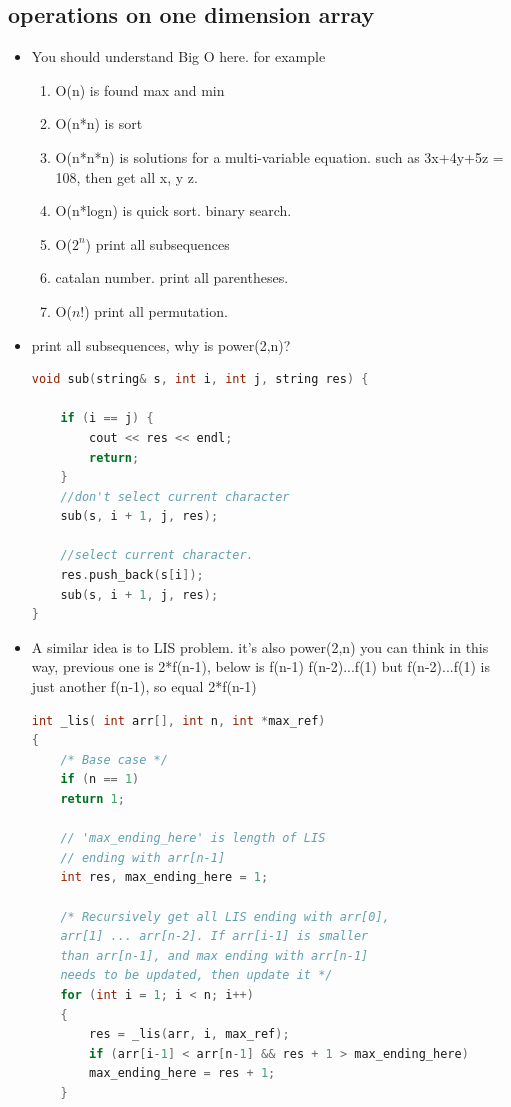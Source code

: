 \documentclass[a4paper,11pt,twoside]{book}
\begin{document}
\subsection{operations on one dimension array}
\begin{itemize}
	\item You should understand Big O here. for example 
	\begin{enumerate}
		\item O(n) is found max and min
		\item O(n*n) is sort
		\item O(n*n*n) is  solutions for a multi-variable equation. such as 3x+4y+5z = 108, then get all x, y z.
		\item O(n*logn) is quick sort. binary search. 
		\item O($2^{n}$) print all subsequences
		\item catalan number. print all parentheses.
		\item O($n!$) print all permutation.
		
	\end{enumerate}
	
	
\item print all subsequences, why is power(2,n)?
\begin{lstlisting}[frame=single, language=c++]
void sub(string& s, int i, int j, string res) {
	
	if (i == j) {
		cout << res << endl;
		return;
	}
	//don't select current character
	sub(s, i + 1, j, res);
	
	//select current character.
	res.push_back(s[i]);
	sub(s, i + 1, j, res);
}
\end{lstlisting}


\item A similar idea is to LIS problem. it's also power(2,n)
you can think in this way, previous one is 2*f(n-1), below is f(n-1) f(n-2)...f(1)
but f(n-2)...f(1) is just another f(n-1), so equal 2*f(n-1) 
\begin{lstlisting}[frame=single, language=c++]
int _lis( int arr[], int n, int *max_ref)
{
	/* Base case */
	if (n == 1)
	return 1;
	
	// 'max_ending_here' is length of LIS
	// ending with arr[n-1]
	int res, max_ending_here = 1;
	
	/* Recursively get all LIS ending with arr[0],
	arr[1] ... arr[n-2]. If arr[i-1] is smaller
	than arr[n-1], and max ending with arr[n-1]
	needs to be updated, then update it */
	for (int i = 1; i < n; i++)
	{
		res = _lis(arr, i, max_ref);
		if (arr[i-1] < arr[n-1] && res + 1 > max_ending_here)
		max_ending_here = res + 1;
	}
	

\end{lstlisting}
\end{itemize}
\end{document}
